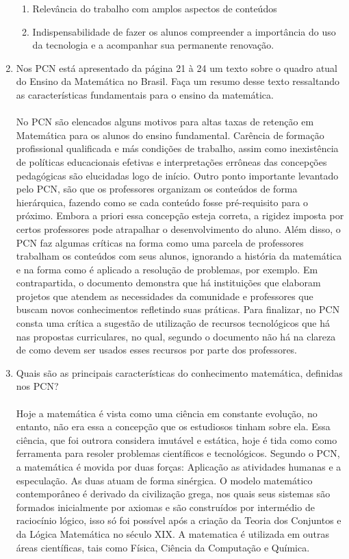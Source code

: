 \documentclass[a4paper, 12pt]{article}
\begin{document}
\begin{enumerate}
\begin{enumerate}
  \item Relevância do trabalho com amplos aspectos de conteúdos
  \item Indispensabilidade de fazer os alunos compreender a importância do uso da tecnologia e a acompanhar sua permanente renovação.
  \end{enumerate}
\item Nos PCN está apresentado da página 21 à 24 um texto sobre o quadro atual do Ensino da Matemática no Brasil. Faça um resumo desse texto ressaltando as características fundamentais para o ensino da matemática. \\ \\
No PCN são elencados alguns motivos para altas taxas de retenção em Matemática para os alunos do ensino fundamental. Carência de formação profissional qualificada e más condições de trabalho, assim como inexistência de políticas educacionais efetivas e interpretações errôneas das concepções pedagógicas são elucidadas logo de início. Outro ponto importante levantado pelo PCN, são que os professores organizam os conteúdos de forma hierárquica, fazendo como se cada conteúdo fosse pré-requisito para o próximo. Embora a priori essa concepção esteja correta, a rigidez imposta por certos professores pode atrapalhar o desenvolvimento do aluno. Além disso, o PCN faz algumas críticas na forma como uma parcela de professores trabalham os conteúdos com seus alunos, ignorando a história da matemática e na forma como é aplicado a resolução de problemas, por exemplo. Em contrapartida, o documento demonstra que há instituições que elaboram projetos que atendem as necessidades da comunidade e professores que buscam novos conhecimentos refletindo suas práticas. Para finalizar, no PCN consta uma crítica a sugestão de utilização de recursos tecnológicos que há nas propostas curriculares, no qual, segundo o documento não há na clareza de como devem ser usados esses recursos por parte dos professores.
\item Quais são as principais características do conhecimento matemática, definidas nos PCN? \\ \\
 Hoje a matemática é vista como uma ciência em constante evolução, no entanto, não era essa a concepção que os estudiosos tinham sobre ela. Essa ciência, que foi outrora considera imutável e estática, hoje é tida como como ferramenta para resoler problemas científicos e tecnológicos. Segundo o PCN, a matemática é movida por duas forças: Aplicação as atividades humanas e a especulação. As duas atuam de forma sinérgica. O modelo matemático contemporâneo é derivado da civilização grega, nos quais seus sistemas são formados inicialmente por axiomas e são construídos por intermédio de raciocínio lógico, isso só foi possível após a criação da Teoria dos Conjuntos e da Lógica Matemática no século XIX. A matematica é utilizada em outras áreas científicas, tais como Física, Ciência da Computação e Química.

\end{enumerate}
\end{document}
